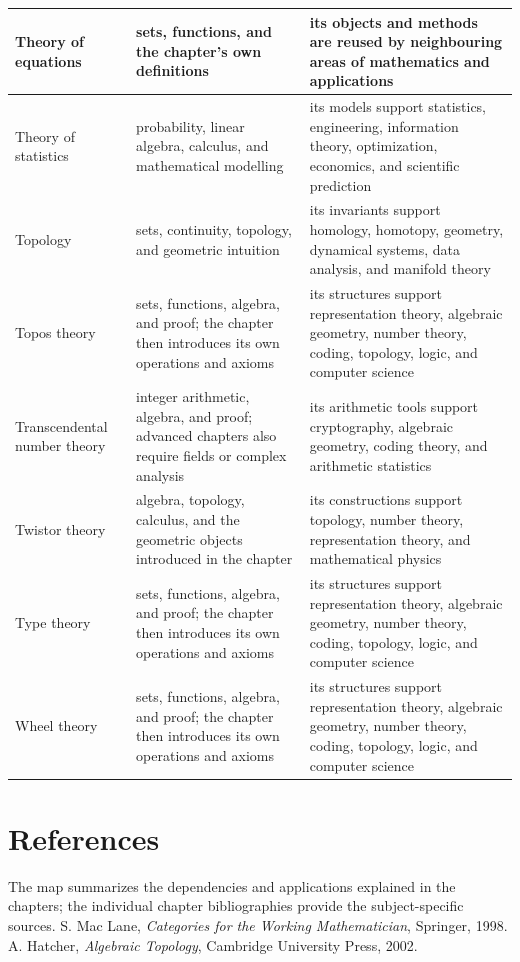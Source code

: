 \documentclass[11pt,oneside]{book}
\makeatletter
\renewenvironment{thebibliography}[1]
  {\list{\@biblabel{\@arabic\c@enumiv}}%
    {\settowidth\labelwidth{\@biblabel{#1}}%
     \leftmargin\labelwidth
     \advance\leftmargin\labelsep
     \usecounter{enumiv}%
     \let\p@enumiv\@empty
     \renewcommand\theenumiv{\@arabic\c@enumiv}}}
  {\endlist}
\makeatother
\begin{document}
\begin{longtable}{>{\raggedright\arraybackslash}p{}>{\raggedright\arraybackslash}p{}>{\raggedright\arraybackslash}p{}}
\hline
Theory of equations & sets, functions, and the chapter's own definitions & its objects and methods are reused by neighbouring areas of mathematics and applications\\
\hline
Theory of statistics & probability, linear algebra, calculus, and mathematical modelling & its models support statistics, engineering, information theory, optimization, economics, and scientific prediction\\
\hline
Topology & sets, continuity, topology, and geometric intuition & its invariants support homology, homotopy, geometry, dynamical systems, data analysis, and manifold theory\\
\hline
Topos theory & sets, functions, algebra, and proof; the chapter then introduces its own operations and axioms & its structures support representation theory, algebraic geometry, number theory, coding, topology, logic, and computer science\\
\hline
Transcendental number theory & integer arithmetic, algebra, and proof; advanced chapters also require fields or complex analysis & its arithmetic tools support cryptography, algebraic geometry, coding theory, and arithmetic statistics\\
\hline
Twistor theory & algebra, topology, calculus, and the geometric objects introduced in the chapter & its constructions support topology, number theory, representation theory, and mathematical physics\\
\hline
Type theory & sets, functions, algebra, and proof; the chapter then introduces its own operations and axioms & its structures support representation theory, algebraic geometry, number theory, coding, topology, logic, and computer science\\
\hline
Wheel theory & sets, functions, algebra, and proof; the chapter then introduces its own operations and axioms & its structures support representation theory, algebraic geometry, number theory, coding, topology, logic, and computer science\\
\hline
\end{longtable}
\setlength{\tabcolsep}{6pt}
\fussy
\normalsize
\section*{References}
The map summarizes the dependencies and applications explained in the chapters; the individual chapter bibliographies provide the subject-specific sources.
\begin{thebibliography}{9}
 S. Mac Lane, \emph{Categories for the Working Mathematician}, Springer, 1998.
 A. Hatcher, \emph{Algebraic Topology}, Cambridge University Press, 2002.
\end{thebibliography}
\end{document}
